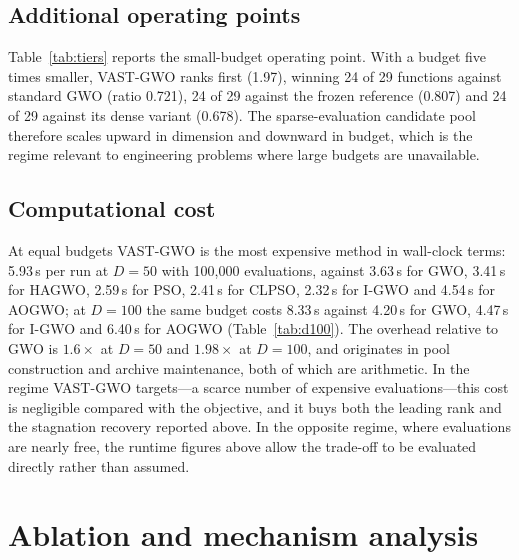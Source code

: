 \documentclass[11pt,a4paper]{article}
\newcommand{\method}{VAST-GWO}
\begin{document}


\subsection{Additional operating points}
Table~\ref{tab:tiers} reports the small-budget operating point. With a budget
five times smaller, \method{} ranks first (1.97), winning 24 of 29 functions
against standard GWO (ratio 0.721), 24 of 29 against the frozen reference
(0.807) and 24 of 29 against its dense variant (0.678). The sparse-evaluation candidate pool therefore scales upward in
dimension and downward in budget, which is the regime relevant to engineering
problems where large budgets are unavailable.

\begin{table}[t]
\centering
\small
\caption{Small-budget configuration: 20{,}000 evaluations,
$D=50$, 29 functions, ten seeds. Ratios are relative to \method{} (below one
favours \method) with win--loss counts in parentheses.}
\label{tab:tiers}
\resizebox{\linewidth}{!}{}
\end{table}

\subsection{Computational cost}
At equal budgets \method{} is the most expensive method in wall-clock terms:
5.93\,s per run at $D=50$ with 100{,}000 evaluations, against 3.63\,s for GWO,
3.41\,s for HAGWO, 2.59\,s for PSO, 2.41\,s for CLPSO, 2.32\,s for I-GWO and
4.54\,s for AOGWO; at $D=100$ the same budget costs 8.33\,s against 4.20\,s
for GWO, 4.47\,s for I-GWO and 6.40\,s for AOGWO (Table~\ref{tab:d100}). The
overhead relative to GWO is $1.6\times$ at $D=50$ and $1.98\times$ at $D=100$,
and originates in pool construction and archive
maintenance, both of which are arithmetic. In the regime \method{} targets---a
scarce number of expensive evaluations---this cost is negligible compared with
the objective, and it buys both the leading rank and the stagnation recovery
reported above. In the opposite regime, where evaluations are nearly free, the
runtime figures above allow the trade-off to be evaluated directly rather than
assumed.
\section{Ablation and mechanism analysis}
\label{sec:ablation}
\end{document}
